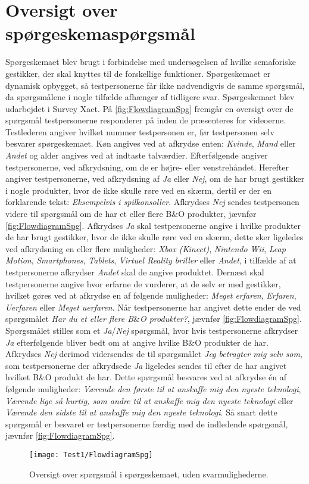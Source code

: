 \chapter{Oversigt over spørgeskemaspørgsmål}
\label{app:FlowdiagramSPG}
%
Spørgeskemaet blev brugt i forbindelse med undersøgelsen af hvilke semaforiske gestikker, der skal knyttes til de forskellige funktioner. Spørgeskemaet er dynamisk opbygget, så testpersonerne får ikke nødvendigvis de samme spørgsmål, da spørgsmålene i nogle tilfælde afhænger af tidligere svar. Spørgeskemaet blev udarbejdet i Survey Xact.\blankline
%
På \autoref{fig:FlowdiagramSpg} fremgår en oversigt over de spørgsmål testpersonerne responderer på inden de præsenteres for videoerne. Testlederen angiver hvilket nummer testpersonen er, før testpersonen selv besvarer spørgeskemaet. Køn angives ved at afkrydse enten: \textit{Kvinde}, \textit{Mand} eller \textit{Andet} og alder angives ved at indtaste talværdier. Efterfølgende angiver testpersonerne, ved afkrydsning, om de er højre- eller venstrehåndet. Herefter angiver testpersonerne, ved afkrydsning af \textit{Ja} eller \textit{Nej}, om de har brugt gestikker i nogle produkter, hvor de ikke skulle røre ved en skærm, dertil er der en forklarende tekst: \textit{Eksempelvis i spilkonsoller}. Afkrydses \textit{Nej} sendes testpersonen videre til spørgsmål om de har et eller flere B$\&$O produkter, jævnfør \autoref{fig:FlowdiagramSpg}. Afkrydses \textit{Ja} skal testpersonerne angive i hvilke produkter de har brugt gestikker, hvor de ikke skulle røre ved en skærm, dette sker ligeledes ved afkrydsning en eller flere muligheder: \textit{Xbox (Kinect)}, \textit{Nintendo Wii}, \textit{Leap Motion}, \textit{Smartphones}, \textit{Tablets}, \textit{Virtuel Reality briller} eller \textit{Andet}, i tilfælde af at testpersonerne afkrydser \textit{Andet} skal de angive produktet. Dernæst skal testpersonerne angive hvor erfarne de vurderer, at de selv er med gestikker, hvilket gøres ved at afkrydse en af følgende muligheder: \textit{Meget erfaren}, \textit{Erfaren}, \textit{Uerfaren} eller \textit{Meget uerfaren}. Når testpersonerne har angivet dette ender de ved spørgsmålet \textit{Har du et eller flere B$\&$O produkter?}, jævnfør \autoref{fig:FlowdiagramSpg}. Spørgsmålet stilles som et \textit{Ja}/\textit{Nej} spørgsmål, hvor hvis testpersonerne afkrydser \textit{Ja} efterfølgende bliver bedt om at angive hvilke B$\&$O produkter de har. Afkrydses \textit{Nej} derimod vidersendes de til spørgsmålet \textit{Jeg betragter mig selv som}, som testpersonerne der afkrydsede \textit{Ja} ligeledes sendes til efter de har angivet hvilket B$\&$O produkt de har. Dette spørgsmål besvares ved at afkrydse én af følgende muligheder: \textit{Værende den første til at anskaffe mig den nyeste teknologi}, \textit{Værende lige så hurtig, som andre til at anskaffe mig den nyeste teknologi} eller \textit{Værende den sidste til at anskaffe mig den nyeste teknologi}. Så snart dette spørgsmål er besvaret er testpersonerne færdig med de indledende spørgsmål, jævnfør \autoref{fig:FlowdiagramSpg}.
%
\begin{figure}[H]
	\centering
	\texttt{[image: Test1/FlowdiagramSpg]}
	\caption{Oversigt over spørgsmål i spørgeskemaet, uden svarmulighederne.}
	\label{fig:FlowdiagramSpg}
\end{figure}
\noindent
%
